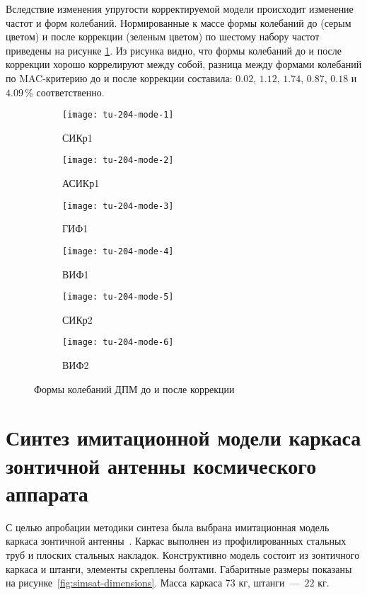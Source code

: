 Вследствие изменения упругости корректируемой модели происходит изменение частот и форм колебаний. Нормированные к массе формы колебаний до (серым цветом) и после коррекции (зеленым цветом) по шестому набору частот приведены на рисунке \ref{fig:tu-204-modes}. Из рисунка видно, что формы колебаний до и после коррекции хорошо коррелируют между собой, разница между формами колебаний по MAC-критерию до и после коррекции составила: $ 0.02 $, $ 1.12 $, $ 1.74 $, $ 0.87 $, $ 0.18 $ и $ 4.09 $\,\% соответственно.

\def\sfTu204Mode{0.32\textwidth}

\begin{figure}[H]
	\centering
	\begin{subfigure}[b]{\sfTu204Mode}
		\centering
		\texttt{[image: tu-204-mode-1]}
		\caption{СИКр1} 
	\end{subfigure}
	\begin{subfigure}[b]{\sfTu204Mode}
		\centering
		\texttt{[image: tu-204-mode-2]}
		\caption{АСИКр1}
	\end{subfigure}
	\begin{subfigure}[b]{\sfTu204Mode}
		\centering
		\texttt{[image: tu-204-mode-3]}
		\caption{ГИФ1}
	\end{subfigure}	
	\begin{subfigure}[b]{\sfTu204Mode}
		\centering
		\texttt{[image: tu-204-mode-4]}
		\caption{ВИФ1}
	\end{subfigure}	
	\begin{subfigure}[b]{\sfTu204Mode}
		\centering
		\texttt{[image: tu-204-mode-5]}
		\caption{СИКр2}
	\end{subfigure}
	\begin{subfigure}[b]{\sfTu204Mode}
		\centering
		\texttt{[image: tu-204-mode-6]}
		\caption{ВИФ2} 
	\end{subfigure}
	\caption{Формы колебаний ДПМ до и после коррекции} \label{fig:tu-204-modes}
\end{figure}

\section{Синтез имитационной модели каркаса зонтичной антенны космического аппарата}

С целью апробации методики синтеза была выбрана имитационная модель каркаса зонтичной антенны~. Каркас выполнен из профилированных стальных труб и плоских стальных накладок. Конструктивно модель состоит из зонтичного каркаса и штанги, элементы скреплены болтами. Габаритные размеры показаны на рисунке~\ref{fig:simsat-dimensions}. Масса каркаса $ 73 $ кг, штанги~---~$ 22 $ кг.

